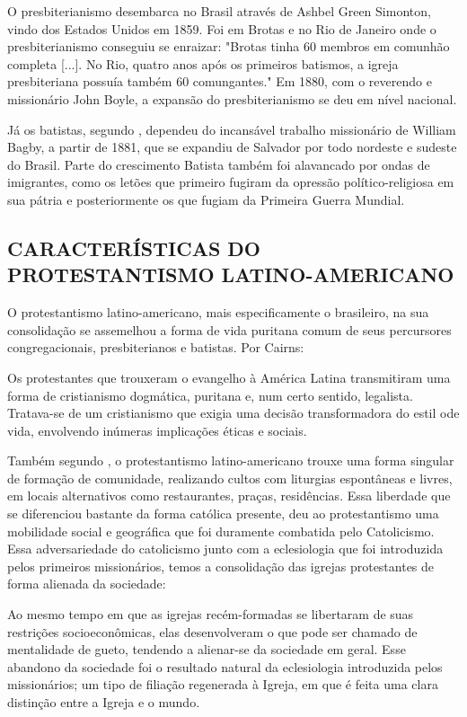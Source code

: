 \documentclass[
    article,            %
	12pt,				%
	oneside,			%
	a4paper,			%
	chapter=TITLE,		%
	section=TITLE,		%
	english,			%
	french,				%
	spanish,			%
	brazil				%
	]{abntex2}
\begin{document}
O presbiterianismo desembarca no Brasil através de Ashbel Green Simonton, vindo dos Estados Unidos em 1859. Foi em Brotas e no Rio de Janeiro onde o presbiterianismo conseguiu se enraizar: "Brotas tinha 60 membros em comunhão completa [...]. No Rio, quatro anos após os primeiros batismos, a igreja presbiteriana possuía também 60 comungantes." \cite[p.416]{CAIRNS} Em 1880, com o reverendo e missionário John Boyle, a expansão do presbiterianismo se deu em nível nacional.

Já os batistas, segundo , dependeu do incansável trabalho missionário de William Bagby, a partir de 1881, que se expandiu de Salvador por todo nordeste e sudeste do Brasil. Parte do crescimento Batista também foi alavancado por ondas de imigrantes, como os letões que primeiro fugiram da opressão político-religiosa em sua pátria e posteriormente os que fugiam da Primeira Guerra Mundial.
\subsection{CARACTERÍSTICAS DO PROTESTANTISMO LATINO-AMERICANO}
O protestantismo latino-americano, mais especificamente o brasileiro, na sua consolidação se assemelhou a forma de vida puritana comum de seus percursores congregacionais, presbiterianos e batistas. Por Cairns:
\begin{citacao}
Os protestantes que trouxeram o evangelho à América Latina transmitiram uma forma de cristianismo dogmática, puritana e, num certo sentido, legalista. Tratava-se de um cristianismo que exigia uma decisão transformadora do estil ode vida, envolvendo inúmeras implicações éticas e sociais. \cite[p.425]{CAIRNS}
\end{citacao}

Também segundo , o protestantismo latino-americano trouxe uma forma singular de formação de comunidade, realizando cultos com liturgias espontâneas e livres, em locais alternativos como restaurantes, praças, residências. Essa liberdade que se diferenciou bastante da forma católica presente, deu ao protestantismo uma mobilidade social e geográfica que foi duramente combatida pelo Catolicismo. Essa adversariedade do catolicismo junto com a eclesiologia que foi introduzida pelos primeiros missionários, temos a consolidação das igrejas protestantes de forma alienada da sociedade:
\begin{citacao}
Ao mesmo tempo em que as igrejas recém-formadas se libertaram de suas restrições socioeconômicas, elas desenvolveram o que pode ser chamado de mentalidade de gueto, tendendo a alienar-se da sociedade em geral. Esse abandono da sociedade foi o resultado natural da eclesiologia introduzida pelos missionários; um tipo de filiação regenerada à Igreja, em que é feita uma clara distinção entre a Igreja e o mundo. \cite[p.425]{CAIRNS}
\end{citacao}
\end{document}
